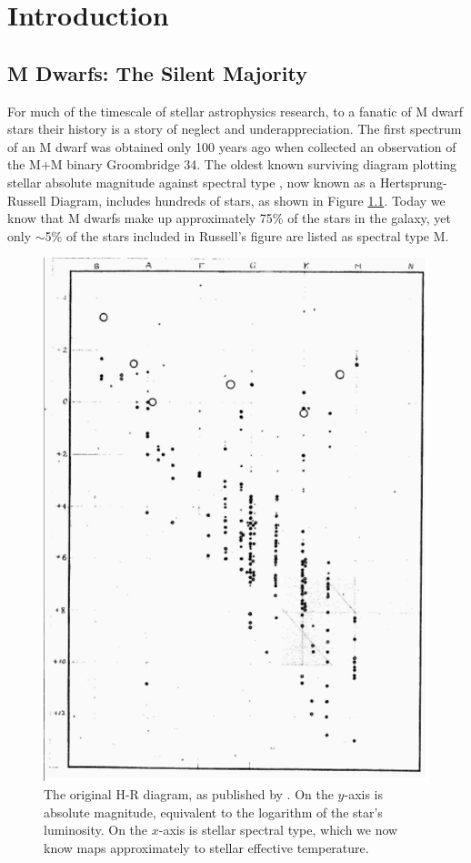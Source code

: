 \documentclass[12pt]{caltech_thesis}
\begin{document}
\tableofcontents
\listoffigures
\listoftables

\mainmatter

\chapter{Introduction}

\section{M Dwarfs: The Silent Majority}
For much of the timescale of stellar astrophysics research, to a fanatic 
of M dwarf stars their history is a story of neglect and underappreciation.
The first spectrum of an M dwarf was obtained only 100 years ago when 
\citet{Adams13} collected an observation of the M+M binary Groombridge 34.
The oldest known surviving diagram plotting stellar absolute magnitude against spectral type \citep{Russell14}, now known as a Hertsprung-Russell Diagram, includes hundreds of stars, as shown in Figure \ref{fig:HR}.
Today we know that M dwarfs make up approximately 75\% of the stars in the galaxy,
yet only $\sim$5\% of the stars included in Russell's figure are listed as
spectral type M.



\begin{figure}[hbt!]
\centering
\includegraphics[width=.5\textwidth]{hr.png}
\caption[Russell's original H-R Diagram]{The original H-R diagram, as published by
\citet{Russell14}. On the $y$-axis is absolute magnitude, equivalent to the logarithm
of the star's luminosity. On the $x$-axis is stellar spectral type, which we now know
maps approximately to stellar effective temperature.}
\label{fig:HR}
\end{figure}
\end{document}
